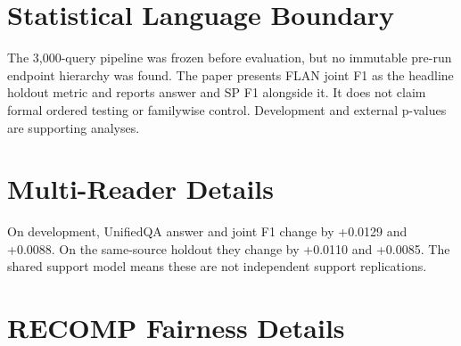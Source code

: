 \documentclass[10pt,twocolumn]{article}
\begin{document}
\begin{table}[t]
\centering
\small
\caption{Selector fold configurations and outcomes.}
\label{tab:app-2}
\end{table}

\section{Statistical Language Boundary}

The 3,000-query pipeline was frozen before evaluation, but no immutable pre-run endpoint hierarchy was found. The paper presents FLAN joint F1 as the headline holdout metric and reports answer and SP F1 alongside it. It does not claim formal ordered testing or familywise control. Development and external p-values are supporting analyses.

\section{Multi-Reader Details}

On development, UnifiedQA answer and joint F1 change by +0.0129 and +0.0088. On the same-source holdout they change by +0.0110 and +0.0085. The shared support model means these are not independent support replications.

\section{RECOMP Fairness Details}
\end{document}
